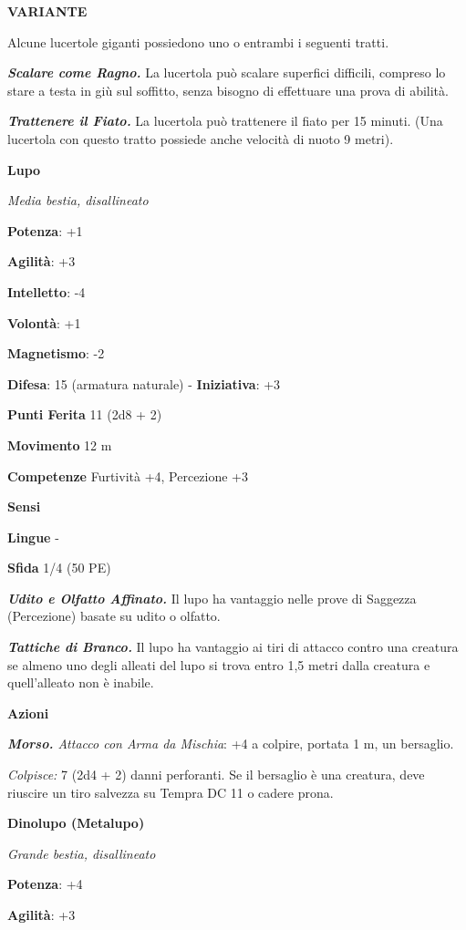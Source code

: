 \begin{multicols}{2}
\textbf{VARIANTE}

Alcune lucertole giganti possiedono uno o entrambi i seguenti tratti.

\emph{\textbf{Scalare come Ragno.}} La lucertola può scalare superfici
difficili, compreso lo stare a testa in giù sul soffitto, senza bisogno
di effettuare una prova di abilità.

\emph{\textbf{Trattenere il Fiato.}} La lucertola può trattenere il
fiato per 15 minuti. (Una lucertola con questo tratto possiede anche
velocità di nuoto 9 metri).

\textbf{Lupo}

\emph{Media bestia, disallineato}

\textbf{Potenza}: +1

\textbf{Agilità}: +3

\textbf{Intelletto}: -4

\textbf{Volontà}: +1

\textbf{Magnetismo}: -2

\textbf{Difesa}: 15 (armatura naturale) - \textbf{Iniziativa}: +3

\textbf{Punti Ferita} 11 (2d8 + 2)

\textbf{Movimento} 12 m

\textbf{Competenze} Furtività +4, Percezione +3

\textbf{Sensi} 

\textbf{Lingue} -

\textbf{Sfida} 1/4 (50 PE)\smallskip

\emph{\textbf{Udito e Olfatto Affinato.}} Il lupo ha vantaggio nelle
prove di Saggezza (Percezione) basate su udito o olfatto.

\emph{\textbf{Tattiche di Branco.}} Il lupo ha vantaggio ai tiri di
attacco contro una creatura se almeno uno degli alleati del lupo si
trova entro 1,5 metri dalla creatura e quell'alleato non è inabile.

\smallskip\textbf{Azioni}

\emph{\textbf{Morso.} Attacco con Arma da Mischia}: +4 a colpire,
portata 1 m, un bersaglio.

\emph{Colpisce:} 7 (2d4 + 2) danni perforanti. Se il bersaglio è una
creatura, deve riuscire un tiro salvezza su Tempra DC 11 o cadere prona.

\textbf{Dinolupo (Metalupo)}

\emph{Grande bestia, disallineato}

\textbf{Potenza}: +4

\textbf{Agilità}: +3


\end{multicols}
